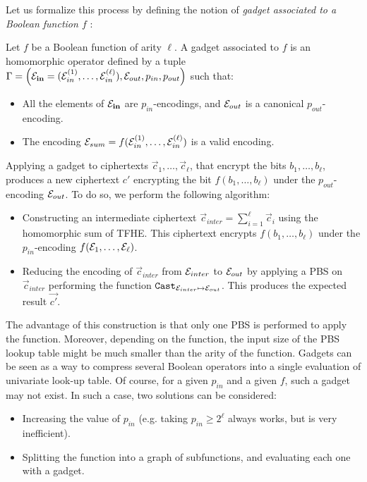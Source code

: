Let us formalize this process by defining the notion of \textit{gadget associated to a Boolean function $f$} :
\begin{definition}[Gadget]
    Let $f$ be a Boolean function of arity $\ell$.
    A gadget associated to $f$ is an homomorphic operator defined by a tuple $\Gamma = \left ( \mathbf{\mathcal{E}_{in}} = (\mathcal{E}_{in}^{(1)}, \dots, \mathcal{E}_{in}^{(\ell)}), \mathcal{E}_{out}, p_{in}, p_{out} \right )$ such that:
    \begin{itemize}
        \item All the elements of $\mathbf{\mathcal{E}_{in}}$ are $p_{in}$-encodings, and $\mathcal{E}_{out}$ is a canonical $p_{out}$-encoding.
        \item The encoding $\mathcal{E}_{sum} = f(\mathcal{E}_{in}^{(1)}, \dots, \mathcal{E}_{in}^{(\ell)})$ is a valid encoding.
    \end{itemize}
Applying a gadget to ciphertexts  $\vec c_1, \dots, \vec c_\ell$, that encrypt the bits $b_1, \dots, b_\ell$, produces a new ciphertext $c'$ encrypting the bit $f(b_1, \dots, b_\ell)$ under the $p_{out}$-encoding $\mathcal{E}_{out}$. To do so, we perform the following algorithm:
\begin{itemize}
    \item Constructing an intermediate ciphertext $\vec{c}_{inter} = \sum_{i=1}^{\ell} \vec{c}_i$ using the homomorphic sum of \gls{TFHE}. This ciphertext encrypts $f(b_1, \dots, b_\ell)$ under the $p_{in}$-encoding $f(\mathcal{E}_1, \dots, \mathcal{E}_\ell)$.
    \item Reducing the encoding of $\vec{c}_{inter}$ from $\mathcal{E}_{inter}$ to $\mathcal{E}_{out}$ by applying a \gls{PBS} on $\vec{c}_{inter}$ performing the function $\texttt{Cast}_{\mathcal{E}_{inter} \mapsto \mathcal{E}_{out}}$. This produces the expected result $\vec{c'}$.
    \end{itemize}
\label{def:gadget}
\end{definition}


The advantage of this construction is that only one \gls{PBS} is performed to apply the function. Moreover, depending on the function, the input size of the \gls{PBS} lookup table might be much smaller than the arity of the function. Gadgets can be seen as a way to compress several Boolean operators into a single evaluation of univariate look-up table.
Of course, for a given $p_{in}$ and a given $f$, such a gadget may not exist. In such a case, two solutions can be considered:
\begin{itemize}
    \item Increasing the value of $p_{in}$ (e.g.  taking $p_{in} \ge 2^\ell$ always works, but is very inefficient).
    \item Splitting the function into a graph of subfunctions, and evaluating each one with a gadget.
\end{itemize}

